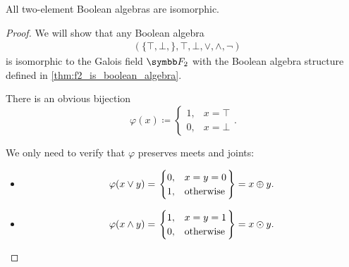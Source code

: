 \begin{proposition}\label{thm:binary_boolean_algebras_are_isomorphic}
  All two-element Boolean algebras are isomorphic.
\end{proposition}
\begin{proof}
  We will show that any Boolean algebra
  \begin{align*}
    &(\{ \top, \bot, \}, \top, \bot, \lor, \land, \neg)
  \end{align*}
  is isomorphic to the Galois field \( \BF_2 \) with the Boolean algebra structure defined in \cref{thm:f2_is_boolean_algebra}.

  There is an obvious bijection
  \begin{equation*}
    \varphi(x) \coloneqq \begin{cases}
      1, &x = \top \\
      0, &x = \bot
    \end{cases}.
  \end{equation*}

  We only need to verify that \( \varphi \) preserves meets and joints:
  \begin{itemize}
    \item \begin{equation*}
      \varphi(x \lor y)
      =
      \begin{rcases}
        \begin{cases}
          0, &x = y = 0 \\
          1, &\text{otherwise}
        \end{cases}
      \end{rcases}
      =
      x \oplus y.
    \end{equation*}

    \item \begin{equation*}
      \varphi(x \land y)
      =
      \begin{rcases}
        \begin{cases}
          1, &x = y = 1 \\
          0, &\text{otherwise}
        \end{cases}
      \end{rcases}
      =
      x \odot y.
    \end{equation*}
  \end{itemize}
\end{proof}
